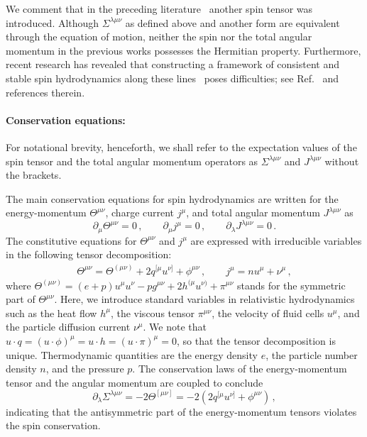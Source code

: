 \documentclass[prl,superscriptaddress,twocolumn,
  showpacs,preprintnumbers,amsmath,amssymb]{revtex4-1}
\begin{document}
We comment that in the preceding literature~\cite{Hattori:2019lfp,Fukushima:2020ucl} another spin tensor was introduced. Although $\Sigma^{\lambda\mu\nu}$ as defined above and another form are equivalent through the equation of motion, neither the spin nor the total angular momentum in the previous works possesses the Hermitian property.  Furthermore, recent research has revealed that constructing a framework of consistent and stable spin hydrodynamics along these lines~\cite{Hattori:2019lfp,Fukushima:2020ucl} poses difficulties; see Ref.~\cite{Xie:2023gbo} and references therein.
\vspace{0.5em}



\paragraph*{Conservation equations:}

For notational brevity, henceforth, we shall refer to the expectation values of the spin tensor and the total angular momentum operators as $\Sigma^{\lambda\mu\nu}$ and $J^{\lambda\mu\nu}$ without the brackets.

The main conservation equations for spin hydrodynamics are written for the energy-momentum $\Theta^{\mu\nu}$, charge current $j^{\mu}$, and total angular momentum $J^{\lambda\mu\nu}$ as
\begin{equation}
  \partial_{\mu}\Theta^{\mu\nu}=0\,,
  \qquad
  \partial_{\mu}j^{\mu}=0\,,
  \qquad
  \partial_{\lambda}J^{\lambda\mu\nu}=0\,.
  \label{eq:ConservationEqs}
\end{equation}
The constitutive equations for $\Theta^{\mu\nu}$ and $j^{\mu}$ are expressed with irreducible variables in the following tensor decomposition:
\begin{align}
  \Theta^{\mu\nu} = \Theta^{(\mu\nu)}+2q^{[\mu}u^{\nu]}+\phi^{\mu\nu}\,,
  \qquad
  j^{\mu}=nu^{\mu}+\nu^{\mu}\,,
  \label{eq:constittuive_eq}
\end{align}
where $\Theta^{(\mu\nu)}=(e+p)u^{\mu}u^{\nu}-pg^{\mu\nu}+2h^{(\mu}u^{\nu)}+\pi^{\mu\nu}$ stands for the symmetric part of $\Theta^{\mu\nu}$.  Here, we introduce standard variables in relativistic hydrodynamics such as the heat flow $h^\mu$, the viscous tensor $\pi^{\mu\nu}$, the velocity of fluid cells $u^\mu$, and the particle diffusion current $\nu^\mu$.  We note that $u\cdot q=(u\cdot \phi)^\mu=u\cdot h=(u\cdot\pi)^\mu=0$, so that the tensor decomposition is unique.  Thermodynamic quantities are the energy density $e$, the particle number density $n$, and the pressure $p$.
The conservation laws of the energy-momentum tensor and the angular momentum are coupled to conclude
\begin{equation}
  \partial_{\lambda}\Sigma^{\lambda\mu\nu}
  = -2\Theta^{[\mu\nu]}
  = -2 (2q^{[\mu} u^{\nu]} + \phi^{\mu\nu})\,,
  \label{eq:SpinEvEq}
\end{equation}
indicating that the antisymmetric part of the energy-momentum tensors violates the spin conservation.
\end{document}
